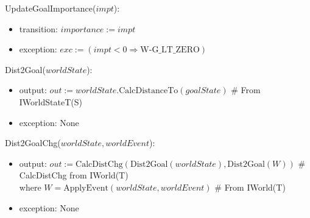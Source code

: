 \noindent UpdateGoalImportance($\mathit{impt}$):
\begin{itemize}

    \item transition: $ \mathit{importance} := \mathit{impt}$

    \item exception: $exc := ( \mathit{impt} < 0 \Rightarrow
    \text{W-G\_LT\_ZERO} )$

\end{itemize}

\noindent Dist2Goal($\mathit{worldState}$):
\begin{itemize}

    \item output: $out := \mathit{worldState}.\text{CalcDistanceTo}
    (\mathit{goalState})$ \# From IWorldStateT(S)

    \item exception: None

\end{itemize}

\noindent Dist2GoalChg($\mathit{worldState}, \mathit{worldEvent}$):
\begin{itemize}

    \item output: $ out := \text{CalcDistChg} \left( \text{Dist2Goal}
    (\mathit{worldState}), \text{Dist2Goal} (W) \right) $ \# CalcDistChg from
    IWorld(T) \\
    where $ W = \text{ApplyEvent}(\mathit{worldState}, \mathit{worldEvent}) $
    \# From IWorld(T)

    \item exception: None

\end{itemize}